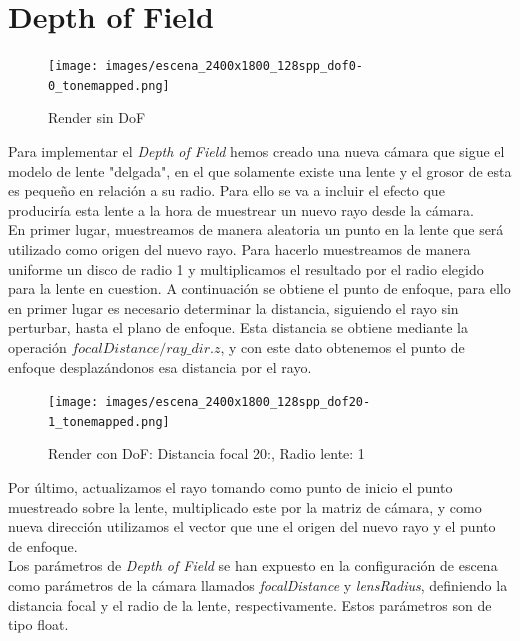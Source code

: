 \documentclass[10pt,oneside,a4paper]{article}
\begin{document}
\section{Depth of Field}

\begin{figure}[h]
\centering
\texttt{[image: images/escena\_2400x1800\_128spp\_dof0-0\_tonemapped.png]}
\caption{Render sin DoF}
\label{fig:disp}
\end{figure}

Para implementar el \textit{Depth of Field} hemos creado una nueva cámara que sigue el modelo de lente "delgada", en el que solamente existe una lente y el grosor de esta es pequeño en relación a su radio. Para ello se va a incluir el efecto que produciría esta lente a la hora de muestrear un nuevo rayo desde la cámara.\\

En primer lugar, muestreamos de manera aleatoria un punto en la lente que será utilizado como origen del nuevo rayo. Para hacerlo muestreamos de manera uniforme un disco de radio 1 y multiplicamos el resultado por el radio elegido para la lente en cuestion. A continuación se obtiene el punto de enfoque, para ello en primer lugar es necesario determinar la distancia, siguiendo el rayo sin perturbar, hasta el plano de enfoque. Esta distancia se obtiene mediante la operación $focalDistance/ ray\_dir.z$, y con este dato obtenemos el punto de enfoque desplazándonos esa distancia por el rayo.\\

\begin{figure}[h]
\centering
\texttt{[image: images/escena\_2400x1800\_128spp\_dof20-1\_tonemapped.png]}
\caption{Render con DoF: Distancia focal 20:, Radio lente: 1}
\label{fig:disp}
\end{figure}

Por último, actualizamos el rayo tomando como punto de inicio el punto muestreado sobre la lente, multiplicado este por la matriz de cámara, y como nueva dirección utilizamos el vector que une el origen del nuevo rayo y el punto de enfoque.\\

Los parámetros de \emph{Depth of Field} se han expuesto en la configuración de escena como parámetros de la cámara llamados \emph{focalDistance} y \emph{lensRadius}, definiendo la distancia focal y el radio de la lente, respectivamente. Estos parámetros son de tipo float.
\end{document}

